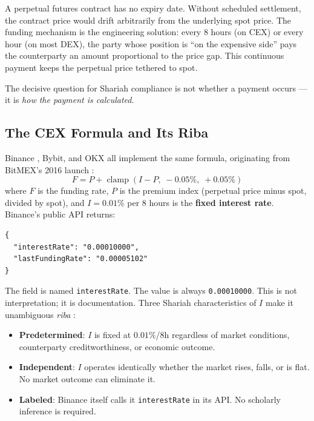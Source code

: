 \documentclass[10pt,twocolumn]{article}
\DeclareMathOperator{\clamp}{clamp}
\begin{document}
A perpetual futures contract has no expiry date. Without scheduled settlement,
the contract price would drift arbitrarily from the underlying spot price. The
funding mechanism is the engineering solution: every 8 hours (on CEX) or every
hour (on most DEX), the party whose position is ``on the expensive side'' pays
the counterparty an amount proportional to the price gap. This continuous
payment keeps the perpetual price tethered to spot.

The decisive question for Shariah compliance is not whether a payment occurs ---
it is \emph{how the payment is calculated}.

\subsection{The CEX Formula and Its Riba}

Binance \cite{Binance2019}, Bybit, and OKX all implement the same formula,
originating from BitMEX's 2016 launch \cite{Hayes2016}:
\begin{equation}
F = P + \clamp(I - P,\;-0.05\%,\;+0.05\%)
\label{eq:cex}
\end{equation}
where $F$ is the funding rate, $P$ is the premium index (perpetual price minus
spot, divided by spot), and $I = 0.01\%$ per 8 hours is the \textbf{fixed
interest rate}. Binance's public API returns:

\begin{Verbatim}[fontsize=\small]
{
  "interestRate": "0.00010000",
  "lastFundingRate": "0.00005102"
}
\end{Verbatim}

The field is named \texttt{interestRate}. The value is always
\texttt{0.00010000}. This is not interpretation; it is documentation. Three
Shariah characteristics of $I$ make it unambiguous \textit{riba}
\cite{ElGamal2006,Uddin2015}:

\begin{itemize}[noitemsep, leftmargin=*]
\item \textbf{Predetermined}: $I$ is fixed at $0.01\%$/8h regardless of market
conditions, counterparty creditworthiness, or economic outcome.
\item \textbf{Independent}: $I$ operates identically whether the market rises,
falls, or is flat. No market outcome can eliminate it.
\item \textbf{Labeled}: Binance itself calls it \texttt{interestRate} in its
API. No scholarly inference is required.
\end{itemize}
\end{document}
